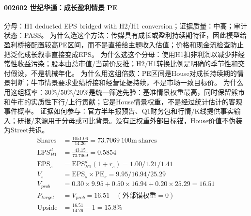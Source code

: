 \paragraph{002602 世纪华通：成长盈利情景 PE}
分母：H1 deducted EPS bridged with H2/H1 conversion；证据质量：中高；审计状态：PASS。
为什么选这个方法：传媒具有成长或盈利持续期特征，因此模型给盈利桥接配置较高PE区间，而不是直接给主题收入估值；价格和现金流检查防止把泛化成长叙事直接变成EPS。
为什么选这个分母：使用H1扣非利润以减少非经常性收益污染；股本由总市值/当前价反推；H2/H1转换比例是明确的季节性和交付假设，不是机械年化。
为什么用这组倍数：PE区间是House对成长持续期的情景判断；牛市情景要求业绩桥接和经营证据持续，不是市场一致目标价。
为什么用这组概率：30\%/50\%/20\%是统一筛选先验：基准情景权重最高，同时保留熊市和牛市的实质性下行/上行贡献；它是House情景权重，不是经过统计估计的客观事件概率。
证据如何参与：官方半年报预告、Q1财务包和行情/K线提供事实输入；研报/来源用于分母或可比背景。没有正权重外部目标锚，House价值不伪装为Street共识。
\begin{align*}
\mathrm{Shares} &= \frac{1051.06}{14.26}=73.7069\ \mathrm{100m\ shares}\\
\mathrm{EPS}_{H1}^d &= \frac{43.15}{73.7069}=0.5854\\
\mathrm{EPS}_s &= \mathrm{EPS}_{H1}^d(1+r_s)=1.00/1.21/1.41\\
V_s &= \mathrm{EPS}_s\times \mathrm{PE}_s=9.95/16.94/25.29\\
V_{prob} &= 0.30\times 9.95+0.50\times 16.94+0.20\times 25.29=16.51\\
P_{target} &= V_{prob}=16.51\quad(\text{外部锚权重}=0)\\
\mathrm{Upside} &= \frac{16.51}{14.26}-1=15.8\%\\
\end{align*}

